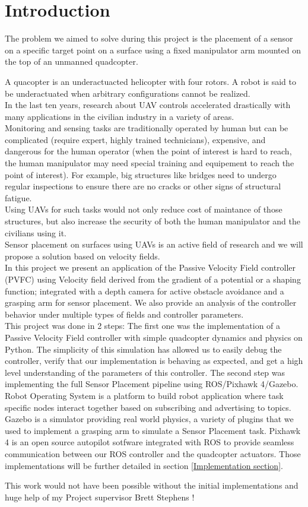 \section{Introduction}
The problem we aimed to solve during this project is the placement of a sensor on a specific target point on a surface using a fixed manipulator arm mounted on the top of an unmanned quadcopter.

A quacopter is an underactuacted helicopter with four rotors. A robot is said to be underactuated when arbitrary configurations cannot be realized.\\
In the last ten years, research about UAV controls accelerated drastically with many applications in the civilian industry in a variety of areas.\\
Monitoring and sensing tasks are traditionally operated by human but can be complicated (require expert, highly trained technicians), expensive,  and dangerous for the human operator (when the point of interest is hard to reach, the human manipulator may need special training and equipement to reach the point of interest). For example, big structures like bridges need to undergo regular inspections to ensure there are no cracks or other signs of structural fatigue.\\
Using UAVs for such tasks would not only reduce cost of maintance of those structures, but also increase the security of both the human manipulator and the civilians using it. \\
Sensor placement on surfaces using UAVs  is an active field of research and we will propose a solution based on velocity fields.\\

In this project we present an application of the Passive Velocity Field controller (PVFC) using Velocity field derived from the gradient of a potential or a shaping function; integrated with a depth camera for active obstacle avoidance and a grasping arm for sensor placement. We also provide an analysis of the controller behavior under multiple types of fields and controller parameters.\\

This project was done in 2 steps: The first one was the implementation of a Passive Velocity Field controller with simple quadcopter dynamics and physics on Python. The simplicity of this simulation has allowed us to easily debug the controller, verify that our implementation is behaving as expected, and get a high level understanding of the parameters of this controller. 
The second step was implementing the full Sensor Placement pipeline using ROS/Pixhawk 4/Gazebo. Robot Operating System is a platform to build robot application where task specific nodes interact together based on subscribing and advertising to topics. Gazebo is a simulator providing real world physics, a variety of plugins that we used to implement a grasping arm to simulate a Sensor Placement task. Pixhawk 4 is an open source autopilot sotfware integrated with ROS to provide seamless communication between our ROS controller and the quadcopter actuators.
Those implementations will be further detailed in section \ref{Implementation section}.

This work would not have been possible without the initial implementations and huge help of my Project supervisor Brett Stephens ! 

